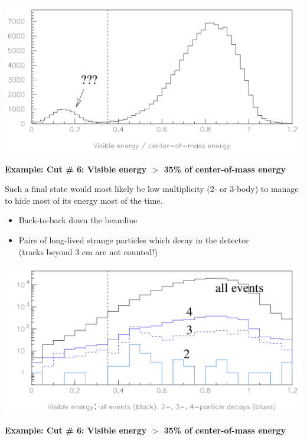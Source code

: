 \documentclass[landscape]{article}
\begin{document}
\includegraphics[width=\linewidth]{visen3_revamp.pdf}

\pagebreak

{\bf Example: Cut \# 6: Visible energy $>$ 35\% of center-of-mass energy}

\vfill

Such a final state would most likely be low multiplicity (2- or
3-body) to manage to hide most of its energy most of the time.

\begin{itemize}

  \item Back-to-back down the beamline

  \item Pairs of long-lived strange particles which decay in the detector \\
  (tracks beyond 3 cm are not counted!)
\end{itemize}

\vfill

\includegraphics[width=\linewidth]{versus_multiplicity_revamp.pdf}

\pagebreak

{\bf Example: Cut \# 6: Visible energy $>$ 35\% of center-of-mass energy}

\vfill
\end{document}
